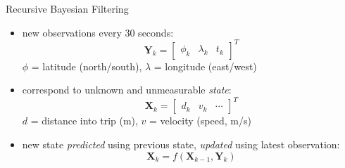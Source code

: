 \documentclass[10pt,t]{beamer}
\newcommand{\bX}{\mathbf{X}}
\newcommand{\bY}{\mathbf{Y}}
\begin{document}
\begin{frame}{Recursive Bayesian Filtering}
  \onslide<+->
  \begin{itemize}[<+->]
    \item new observations every 30 seconds:
      \begin{equation*}
        \bY_k =
        \begin{bmatrix}
          \phi_k & \lambda_k & t_k
        \end{bmatrix}^T
      \end{equation*}
      $\phi$ = latitude (north/south), $\lambda$ = longitude (east/west)

    \item correspond to unknown and unmeasurable \emph{state}:
      \begin{equation*}
        \bX_k =
        \begin{bmatrix}
          d_k & v_k & \cdots
        \end{bmatrix}^T
      \end{equation*}
      $d$ = distance into trip (m), $v$ = velocity (speed, m/s)

    \item new state \emph{predicted} using previous state, \emph{updated} using latest observation:
      \begin{equation*}
        \bX_k = f(\bX_{k-1}, \bY_k)
      \end{equation*}
  \end{itemize}

\end{frame}
\end{document}
